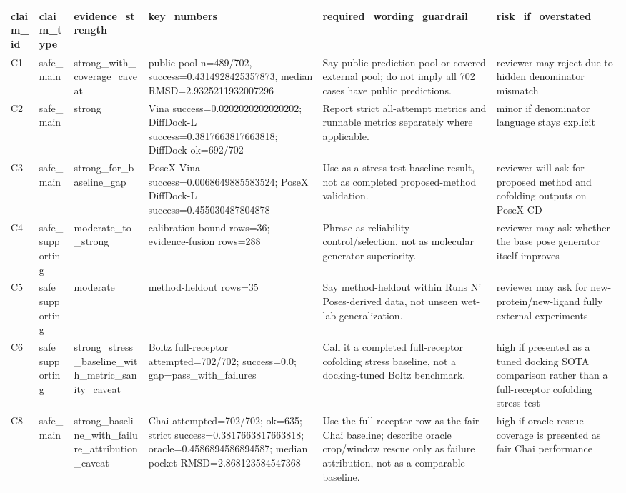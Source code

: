 \begin{tabular}{llllll}
\toprule
claim\_id & claim\_type & evidence\_strength & key\_numbers & required\_wording\_guardrail & risk\_if\_overstated \\
\midrule
C1 & safe\_main & strong\_with\_coverage\_caveat & public-pool n=489/702, success=0.4314928425357873, median RMSD=2.9325211932007296 & Say public-prediction-pool or covered external pool; do not imply all 702 cases have public predictions. & reviewer may reject due to hidden denominator mismatch \\
C2 & safe\_main & strong & Vina success=0.0202020202020202; DiffDock-L success=0.3817663817663818; DiffDock ok=692/702 & Report strict all-attempt metrics and runnable metrics separately where applicable. & minor if denominator language stays explicit \\
C3 & safe\_main & strong\_for\_baseline\_gap & PoseX Vina success=0.0068649885583524; PoseX DiffDock-L success=0.455030487804878 & Use as a stress-test baseline result, not as completed proposed-method validation. & reviewer will ask for proposed method and cofolding outputs on PoseX-CD \\
C4 & safe\_supporting & moderate\_to\_strong & calibration-bound rows=36; evidence-fusion rows=288 & Phrase as reliability control/selection, not as molecular generator superiority. & reviewer may ask whether the base pose generator itself improves \\
C5 & safe\_supporting & moderate & method-heldout rows=35 & Say method-heldout within Runs N' Poses-derived data, not unseen wet-lab generalization. & reviewer may ask for new-protein/new-ligand fully external experiments \\
C6 & safe\_supporting & strong\_stress\_baseline\_with\_metric\_sanity\_caveat & Boltz full-receptor attempted=702/702; success=0.0; gap=pass\_with\_failures & Call it a completed full-receptor cofolding stress baseline, not a docking-tuned Boltz benchmark. & high if presented as a tuned docking SOTA comparison rather than a full-receptor cofolding stress test \\
C8 & safe\_main & strong\_baseline\_with\_failure\_attribution\_caveat & Chai attempted=702/702; ok=635; strict success=0.3817663817663818; oracle=0.4586894586894587; median pocket RMSD=2.868123584547368 & Use the full-receptor row as the fair Chai baseline; describe oracle crop/window rescue only as failure attribution, not as a comparable baseline. & high if oracle rescue coverage is presented as fair Chai performance \\

\end{tabular}
